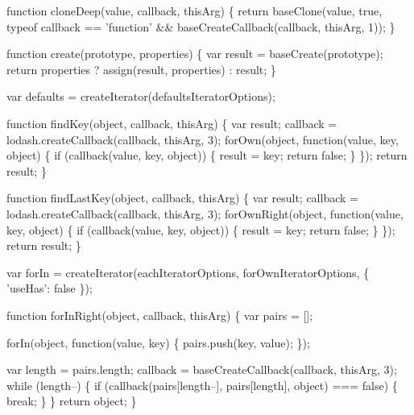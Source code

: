 \begin{DoxyCodeInclude}
    \textcolor{keyword}{function} cloneDeep(value, callback, thisArg) \{
      \textcolor{keywordflow}{return} baseClone(value, \textcolor{keyword}{true}, typeof callback == \textcolor{stringliteral}{'function'} && baseCreateCallback(callback, thisArg, 
      1));
    \}

    \textcolor{keyword}{function} create(prototype, properties) \{
      var result = baseCreate(prototype);
      \textcolor{keywordflow}{return} properties ? assign(result, properties) : result;
    \}

    var defaults = createIterator(defaultsIteratorOptions);

    \textcolor{keyword}{function} findKey(\textcolor{keywordtype}{object}, callback, thisArg) \{
      var result;
      callback = lodash.createCallback(callback, thisArg, 3);
      forOwn(\textcolor{keywordtype}{object}, \textcolor{keyword}{function}(value, key, \textcolor{keywordtype}{object}) \{
        \textcolor{keywordflow}{if} (callback(value, key, \textcolor{keywordtype}{object})) \{
          result = key;
          \textcolor{keywordflow}{return} \textcolor{keyword}{false};
        \}
      \});
      \textcolor{keywordflow}{return} result;
    \}

    \textcolor{keyword}{function} findLastKey(\textcolor{keywordtype}{object}, callback, thisArg) \{
      var result;
      callback = lodash.createCallback(callback, thisArg, 3);
      forOwnRight(\textcolor{keywordtype}{object}, \textcolor{keyword}{function}(value, key, \textcolor{keywordtype}{object}) \{
        \textcolor{keywordflow}{if} (callback(value, key, \textcolor{keywordtype}{object})) \{
          result = key;
          \textcolor{keywordflow}{return} \textcolor{keyword}{false};
        \}
      \});
      \textcolor{keywordflow}{return} result;
    \}

    var forIn = createIterator(eachIteratorOptions, forOwnIteratorOptions, \{
      \textcolor{stringliteral}{'useHas'}: \textcolor{keyword}{false}
    \});

    \textcolor{keyword}{function} forInRight(\textcolor{keywordtype}{object}, callback, thisArg) \{
      var pairs = [];

      forIn(\textcolor{keywordtype}{object}, \textcolor{keyword}{function}(value, key) \{
        pairs.push(key, value);
      \});

      var length = pairs.length;
      callback = baseCreateCallback(callback, thisArg, 3);
      \textcolor{keywordflow}{while} (length--) \{
        \textcolor{keywordflow}{if} (callback(pairs[length--], pairs[length], \textcolor{keywordtype}{object}) === \textcolor{keyword}{false}) \{
          \textcolor{keywordflow}{break};
        \}
      \}
      \textcolor{keywordflow}{return} object;
    \}


\end{DoxyCodeInclude}
